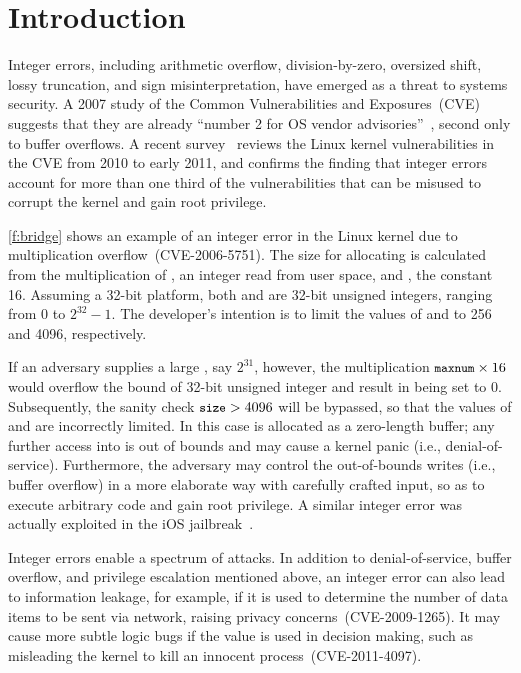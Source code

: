 \section{Introduction}
\label{s:intro}

Integer errors, including arithmetic overflow, division-by-zero,
oversized shift, lossy truncation, and sign misinterpretation, have
emerged as a threat to systems security.  A 2007 study of the
Common Vulnerabilities and Exposures~(CVE)~\cite{cve} suggests that
they are already ``number 2 for OS vendor
advisories''~\cite{christey:vuln}, second only to buffer overflows.
A recent survey~\cite{chen:kbugs} reviews the Linux kernel
vulnerabilities in the CVE from 2010 to early 2011, and confirms
the finding that integer errors account for more than one third of
the vulnerabilities that can be misused to corrupt the kernel and
gain root privilege.

\autoref{f:bridge} shows an example of an integer error in the Linux
kernel due to multiplication overflow~(CVE-2006-5751).  The size
for allocating  is calculated from the multiplication of
, an integer read from user space,
and , the constant 16.  Assuming
a 32-bit platform, both  and  are 32-bit unsigned
integers, ranging from 0 to $2^{32} - 1$.  The developer's intention
is to limit the values of  and  to 256 and 4096,
respectively.

If an adversary supplies a large , say $2^{31}$,
however, the multiplication $\cc{maxnum} \times 16$ would
overflow the bound of 32-bit unsigned integer and result in 
being set to 0.  Subsequently, the sanity check $\cc{size} > 4096$
will be bypassed, so that the values of  and 
are incorrectly limited.  In this case  is allocated as
a zero-length buffer; any further access into  is out of
bounds and may cause a kernel panic (i.e., denial-of-service).
Furthermore, the adversary may control the out-of-bounds writes
(i.e., buffer overflow) in a more elaborate way with carefully
crafted input, so as to execute arbitrary code and gain root
privilege.  A similar integer error was actually exploited
in the iOS jailbreak~\cite{esser:ios}.

Integer errors enable a spectrum of attacks.  In addition to
denial-of-service, buffer overflow, and privilege escalation
mentioned above, an integer error can also lead to information
leakage, for example, if it is used to determine the number of data
items to be sent via network, raising privacy concerns~(CVE-2009-1265).
It may cause more subtle logic bugs if the value is used in decision
making, such as misleading the kernel to kill an innocent
process~(CVE-2011-4097).

